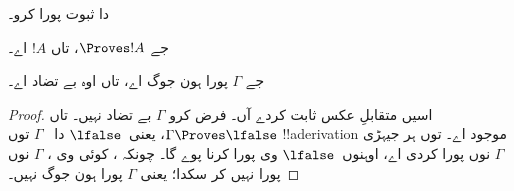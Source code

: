 \documentclass[../../../include/open-logic-section]{subfiles}
\begin{document}
\begin{prob}
   دا ثبوت پورا کرو۔
\end{prob}
\tagendprob

\begin{cor}
جے $\Proves !A$، تاں $!A$  اے۔
\end{cor}

\begin{cor}
جے $\Gamma$ پورا ہون جوگ اے، تاں اوہ بے تضاد اے۔
\end{cor}

\begin{proof}
اسیں متقابلِ عکس ثابت کردے آں۔ فرض کرو $\Gamma$ بے تضاد نہیں۔
تاں $\Gamma \Proves \lfalse$، یعنی~$\lfalse$ دا
~$\Gamma$ توں !!a{derivation} موجود اے۔  توں
ہر 
جیہڑی $\Gamma$ نوں پورا کردی اے، اوہنوں~$\lfalse$ وی پورا کرنا پوے گا۔
چونکہ
، کوئی وی
، $\Gamma$ نوں پورا
نہیں کر سکدا؛ یعنی $\Gamma$ پورا ہون جوگ نہیں۔
\end{proof}
\end{document}
